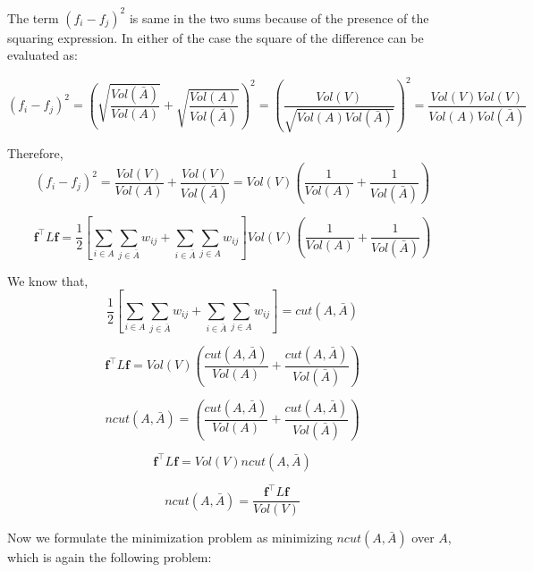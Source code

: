 \documentclass[english]{article}
\theoremstyle{plain}
\begin{document}
The term $(f_{i}-f_{j})^{2}$ is same in the two sums because of the presence of the squaring expression. In either of the case the square of the difference can be evaluated as:

\begin{equation}
(f_{i}-f_{j})^{2} = \left(\sqrt{\frac{Vol(\bar{A})}{Vol(A)}} + \sqrt{\frac{Vol(A)}{Vol(\bar{A})}}\right)^{2} = \left( \frac{Vol(V)}{\sqrt{Vol(A)Vol(\bar{A})}} \right)^{2} = \frac{Vol(V)Vol(V)}{Vol(A)Vol(\bar{A})}  
\end{equation}

Therefore,
\begin{equation}
(f_{i}-f_{j})^{2} =
\frac{Vol(V)}{Vol(A)} + \frac{Vol(V)}{Vol(\bar{A})} = Vol(V)\left(\frac{1}{Vol(A)} + \frac{1}{Vol(\bar{A})}\right)
\end{equation}

\begin{equation}
\boldsymbol{f}^{\top}L\boldsymbol{f} = \frac{1}{2} \left[ \sum_{i \in A} \sum_{j \in \bar{A}}  w_{ij} + \sum_{i \in \bar{A}} \sum_{j \in A}  w_{ij}\right] Vol(V)\left(\frac{1}{Vol(A)} + \frac{1}{Vol(\bar{A})}\right)
\end{equation}

We know that,
\begin{equation}
\frac{1}{2} \left[ \sum_{i \in A} \sum_{j \in \bar{A}}  w_{ij} + \sum_{i \in \bar{A}} \sum_{j \in A}  w_{ij}\right] = cut(A,\bar{A})
\end{equation}

\begin{equation}
\boldsymbol{f}^{\top}L\boldsymbol{f} = Vol(V)\left(\frac{cut(A,\bar{A})}{Vol(A)} + \frac{cut(A,\bar{A})}{Vol(\bar{A})}\right)
\end{equation}

\begin{equation}
ncut(A,\bar{A}) = \left(\frac{cut(A,\bar{A})}{Vol(A)} + \frac{cut(A,\bar{A})}{Vol(\bar{A})}\right)
\end{equation}

\begin{equation}
\boldsymbol{f}^{\top}L\boldsymbol{f} = Vol(V) ncut(A,\bar{A})
\end{equation}

\begin{equation}
ncut(A,\bar{A}) =\frac{\boldsymbol{f}^{\top}L\boldsymbol{f}}{Vol(V)} 
\end{equation}

Now we formulate the minimization problem as minimizing $ncut(A,\bar{A})$ over $A$, which is again the following problem:
\end{document}
